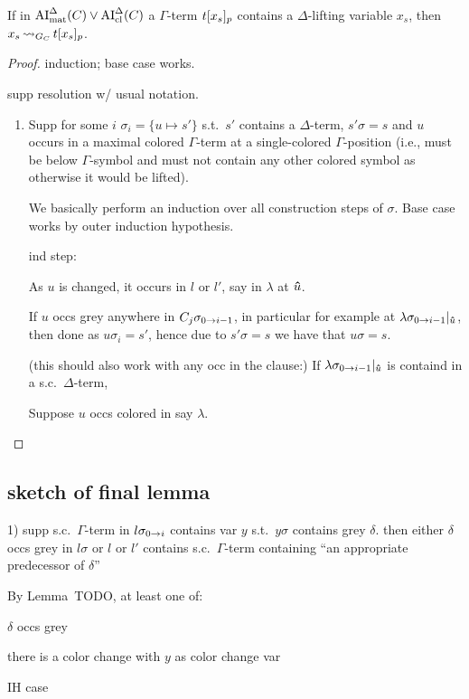 \documentclass[,%
	paper=a4,%
	DIV11, %
	twoside=false,%
	liststotoc,
	bibtotoc,
	draft=false,%
	numbers=noendperiod
]{scrartcl}
\begin{document}
\begin{clemma}
	If in $\operatorname{AI}_\mathrm{mat}^\Delta(C) \lor \operatorname{AI}_\mathrm{cl}^\Delta(C)$ a
	$\Gamma$-term $t{[x_s]_{p}}$ contains a $\Delta$-lifting variable $x_s$, then $x_s \operatorname{\leadsto}_{G_C} t{[x_s]_{p}}$.
\end{clemma}
\begin{proof}
	induction; base case works.

	supp resolution w/ usual notation.

	\begin{enumerate}
		\item Supp for some $i$ $\sigma_i = \{ u \mapsto s' \}$ s.t.\ $s'$ contains a $\Delta$-term, $s'\sigma = s$ and $u$ occurs in a maximal colored $\Gamma$-term at a single-colored $\Gamma$-position (i.e., must be below $\Gamma$-symbol and must not contain any other colored symbol as otherwise it would be lifted).

			We basically perform an induction over all construction steps of $\sigma$. Base case works by outer induction hypothesis.

			ind step:

			As $u$ is changed, it occurs in $l$ or $l'$, say in $\lambda$ at $\bm\hat u$.

			If $u$ occs grey anywhere in $C_{j}\sigma_{0 \rightarrow i-1}$, in particular for example at $\lambda\sigma_{0 \rightarrow i-1}|_{\bm\hat u}$, then done as $u\sigma_i = s'$, hence due to $s'\sigma=s$ we have that $u\sigma = s$.

			(this should also work with any occ in the clause:)
			If $\lambda\sigma_{0 \rightarrow i-1}|_{\bm\hat u}$ is containd in a s.c.\ $\Delta$-term,


			Suppose $u$ occs colored in say $\lambda$.




	\end{enumerate}
\end{proof}


\subsection{sketch of final lemma}

1) 
supp s.c.\ $\Gamma$-term in $l\sigma_{0 \rightarrow i}$ contains var $y$ s.t.\ $y\sigma$ contains grey 
$\delta$.
then either $\delta$ occs grey in $l\sigma$ or $l$ or $l'$ contains s.c.\ $\Gamma$-term containing ``an appropriate predecessor of $\delta$''

By Lemma~TODO, at least one of:
\begin{compactenum}
\item $\delta$ occs grey
\item there is a color change with $y$ as color change var 
\item IH case \checkmark
\end{compactenum}
\end{document}
